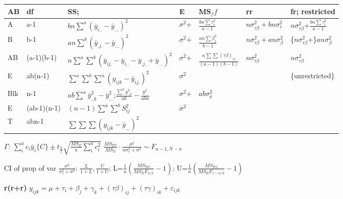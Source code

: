 \documentclass[
  10pt,
  twocolumn]{article}
\begin{document}
\begin{tabular}{l|l|l|ll|l|l}\hline
AB& df & SS;  & E & MS$_ff$  & rr & fr; restricted\\\hline
A &a-1&$bn\sum^a(\bar y_{i..}-\bar y_{...})^2$&$\sigma^2$+&$\frac{bn\sum\tau_i^2}{a-1}$& $n\sigma^2_{\tau\beta}+bn\sigma^2_{\tau}$& $n\sigma^2_{\tau\beta}$+$\frac{bn\sum\tau_i^2}{a-1}$\\
B  &b-1&$an\sum^b(\bar y_{.j.}-\bar y_{...})^2$&$\sigma^2$+&$\frac{an\sum\beta_j^2}{b-1}$& $n\sigma^2_{\tau\beta}+an\sigma^2_{\beta}$& \{$n\sigma^2_{\tau\beta}$+\}$an\sigma^2_{\beta}$\\
AB &(a-1)(b-1)&$n\sum^a\sum^b(\bar y_{ij.}-\bar y_{i..}-\bar y_{.j.}+\bar y_{...})^2$&$\sigma^2$+&$\frac{n\sum\sum(\tau\beta)_{ij}}{(a-1)(b-1)}$& $n\sigma^2_{\tau\beta}$& $n\sigma^2_{\tau\beta}$\\
E&ab(n-1)&$\sum^a\sum^b\sum^n(y_{ijk}-\bar y_{ij.})^2$&$\sigma^2$&&& \{unrestricted\}\\\hline
Blk &n-1&$ab\sum^n\bar y_{..k}^2-\bar y_{...}^2$;$\frac{\sum^ny_{..k}^2}{ab}-\frac{y_{...}^2}{abn}$ &$\sigma^2$+&$ab\sigma_{\delta}^2$ & \\
E&(ab-1)(n-1)&$(n-1)\sum^a\sum^bS_{ij}^2$&$\sigma^2$& &  \\
T&abn-1&$\sum\sum\sum(y_{ijk}-\bar y_{...})^2$ & & \\\hline
\end{tabular}

\(\Gamma\):
\(\sum_{i}^ac_i\bar y_i\{C\}\pm t_{\frac{\alpha}2}\sqrt{\frac{MS_{E}}n\sum_{i}^ac_i^2}\)
\(\frac{MS_{Trt}}{MS_E}\cdot\frac{\sigma^2}{n\sigma_{\tau}^2+\sigma^2}\sim F_{a-1,N-a}\)

CI of prop of var \(\frac{\sigma^2}{\sigma_{\tau}^2+\sigma^2}\):
\(\frac{L}{1+L},\frac{U}{1+U}\);
L=\(\frac1n\left(\frac{MS_{Trt}}{MS_EF_{\alpha/2}}-1\right)\);
U=\(\frac1n\left(\frac{MS_{Trt}}{MS_EF_{1-\alpha/2}}-1\right)\)

\textbf{r(r+r)}
\(y_{ijk}=\mu+\tau_i+\beta_j+\gamma_k+(\tau\beta)_{ij}+(\tau\gamma)_{ik}+\varepsilon_{ijk}\)
\end{document}
